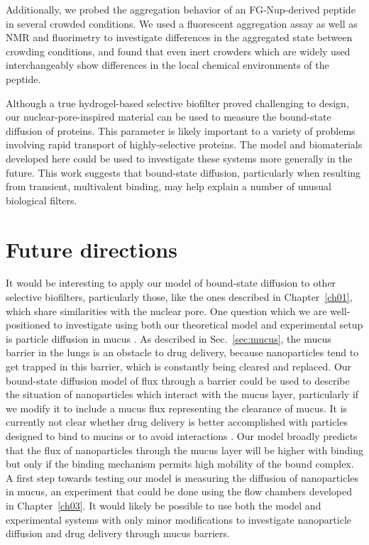 Additionally, we probed the aggregation behavior of an FG-Nup-derived peptide in several crowded conditions.  We used a fluorescent aggregation assay as well as NMR and fluorimetry to investigate differences in the aggregated state between crowding conditions, and found that even inert crowders which are widely used interchangeably show differences in the local chemical environments of the peptide.

Although a true hydrogel-based selective biofilter proved challenging to design, our nuclear-pore-inspired material can be used to measure the bound-state diffusion of proteins.  This parameter is likely important to a variety of problems involving rapid transport of highly-selective proteins.  The model and biomaterials developed here could be used to investigate these systems more generally in the future.  This work suggests that bound-state diffusion, particularly when resulting from transient, multivalent binding, may help explain a number of unusual biological filters.

\section{Future directions}

It would be interesting to apply our model of bound-state diffusion to other selective biofilters, particularly those, like the ones described in Chapter~\ref{ch01}, which share similarities with the nuclear pore.  One question which we are well-positioned to investigate using both our theoretical model and experimental setup is particle diffusion in mucus \cite{witten17,newby18}.  As described in Sec.~\ref{sec:mucus}, the mucus barrier in the lungs is an obstacle to drug delivery, because nanoparticles tend to get trapped in this barrier, which is constantly being cleared and replaced.  Our bound-state diffusion model of flux through a barrier could be used to describe the situation of nanoparticles which interact with the mucus layer, particularly if we modify it to include a mucus flux representing the clearance of mucus.  It is currently not clear whether drug delivery is better accomplished with particles designed to bind to mucins or to avoid interactions \cite{schneider17,lai11}.  Our model broadly predicts that the flux of nanoparticles through the mucus layer will be higher with binding but only if the binding mechanism permits high mobility of the bound complex.  A first step towards testing our model is measuring the diffusion of nanoparticles in mucus, an experiment that could be done using the flow chambers developed in Chapter~\ref{ch03}.  It would likely be possible to use both the model and experimental systems with only minor modifications to investigate nanoparticle diffusion and drug delivery through mucus barriers.

